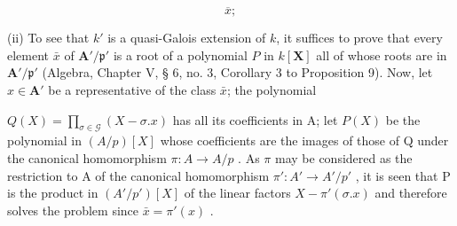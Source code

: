 \[
\overline {{x}};
\]
\fi

(ii) To see that \(k'\) is a quasi-Galois extension of \(k\), it suffices to prove that every element \(\bar{x}\) of \(\mathbf{A}'/\mathfrak{p}'\) is a root of a polynomial \(P\) in \(k[\mathbf{X}]\) all of whose roots are in \(\mathbf{A}'/\mathfrak{p}'\) (Algebra, Chapter V, § 6, no. 3, Corollary 3 to Proposition 9). Now, let \(x \in \mathbf{A}'\) be a representative of the class \(\bar{x}\); the polynomial

\(Q(X) = \prod_{\sigma \in \mathcal{G}} (X - \sigma.x)\) has all its coefficients in A; let \(P(X)\) be the polynomial in \((A/p)[X]\) whose coefficients are the images of those of Q under the canonical homomorphism \(\pi: A \to A/p\) . As \(\pi\) may be considered as the restriction to A of the canonical homomorphism \(\pi': A' \to A'/p'\) , it is seen that P is the product in \((A'/p')[X]\) of the linear factors \(X - \pi'(\sigma.x)\) and therefore solves the problem since \(\bar{x} = \pi'(x)\) .

